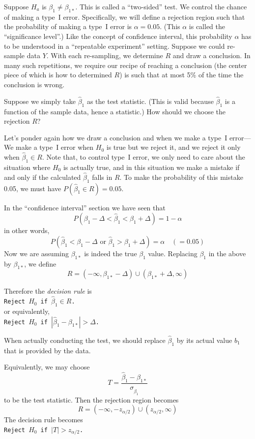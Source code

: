 \documentclass[12pt]{article}
\begin{document}
Suppose $H_a$ is $\beta_1 \ne \beta_{1*}$.
This is called a ``two-sided'' test.
We control the chance of making a type~I error.
Specifically,
we will define a rejection region such that the probability of making a
type~I error is $\alpha = 0.05$.
(This $\alpha$ is called the ``significance level''.)
Like the concept of confidence interval,
this probability $\alpha$ has to be understood in a
``repeatable experiment'' setting.
Suppose we could re-sample data $Y$.
With each re-sampling, we determine $R$ and draw a conclusion.
In many such repetitions, we require our recipe of reaching a conclusion
(the center piece of which is how to determined $R$) is such that
at most 5\% of the time the conclusion is wrong.

Suppose we simply take $\hat\beta_1$ as the test statistic.
(This is valid because $\hat\beta_1$ is a function of the sample data,
hence a statistic.)
How should we choose the rejection $R$?

Let's ponder again how we draw a conclusion and when we make a type~I
error---%
We make a type~I error when $H_0$ is true but we reject it,
and we reject it only when $\hat\beta_1 \in R$.
Note that, to control type~I error,
we only need to care about the situation where
$H_0$ is actually true,
and in this situation we make a mistake
if and only if the calculated $\hat\beta_1$ falls in $R$.
To make the probability of this mistake 0.05,
we must have $P(\hat\beta_1 \in R) = 0.05$.

In the ``confidence interval'' section we have seen that
\[
P(\beta_1 - \Delta < \hat\beta_1 < \beta_1 + \Delta) = 1 - \alpha
\]
in other words,
\[
P(\hat\beta_1 < \beta_1 - \Delta \text{ or } \hat\beta_1 > \beta_1 + \Delta)
= \alpha \quad(= 0.05)
\]
Now we are assuming $\beta_{1*}$ is indeed
the true $\beta_1$ value.
Replacing $\beta_1$ in the above by $\beta_{1*}$, we define
\[
R = (-\infty, \beta_{1*} - \Delta) \cup
    (\beta_{1*} + \Delta, \infty)
\]

Therefore the \emph{decision rule} is
\\
\texttt{Reject $H_0$ if $\hat\beta_1 \in R$.}\\
or equivalently,
\\
\texttt{Reject $H_0$ if $|\hat\beta_1 - \beta_{1*}| > \Delta$.}

When actually conducting the test,
we should replace $\hat\beta_1$ by its actual value $b_1$
that is provided by the data.

Equivalently,
we may choose
\[
T = \frac{\hat\beta_1 - \beta_{1*}}{\sigma_{\hat\beta_1}}
\]
to be the test statistic.
Then the rejection region becomes
\[
R = (-\infty, -z_{\alpha/2}) \cup (z_{\alpha/2}, \infty)
\]
The decision rule becomes
\\
\texttt{Reject $H_0$ if $|T| > z_{\alpha/2}$.}
\end{document}
